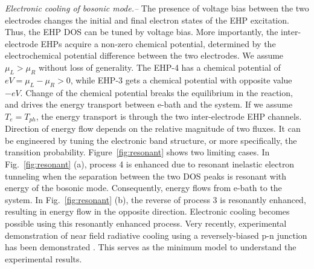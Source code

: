 \documentclass[aps
,twocolumn
,floatfix,footinbib,prl
]{revtex4-1}
\begin{document}
\emph{Electronic cooling of bosonic mode.--}
The presence of voltage bias between the two electrodes changes the initial and final electron states of the EHP excitation. Thus, the EHP DOS can be tuned by voltage bias. More importantly, the inter-electrode EHPs acquire a non-zero chemical potential, determined by the electrochemical potential difference between the two electrodes. We assume $\mu_L>\mu_R$ without loss of generality. The EHP-4 has a chemical potential of $eV=\mu_L-\mu_R>0$, while EHP-3 gets a chemical potential with opposite value $-eV$. Change of the chemical potential breaks the equilibrium in the reaction, and drives the energy transport between e-bath and the system. If we assume $T_e=T_{ph}$, the energy transport is through the two inter-electrode EHP channels.
Direction of energy flow depends on the relative magnitude of two fluxes. It can be engineered by tuning the electronic band structure, or more specifically, the transition probability. Figure~\ref{fig:resonant} shows two limiting cases. In Fig.~\ref{fig:resonant} (a), process 4 is enhanced due to resonant inelastic electron tunneling when the separation between the two DOS peaks is resonant with energy of the bosonic mode. Consequently, energy flows from e-bath to the system. In Fig.~\ref{fig:resonant} (b), the reverse of process 3 is resonantly enhanced, resulting in energy flow in the opposite direction. Electronic cooling becomes possible using this resonantly enhanced process. Very recently, experimental demonstration of near field radiative cooling using a reversely-biased p-n junction has been demonstrated \cite{zhu2019near}. This serves as the minimum model to understand the experimental results.




\end{document}

